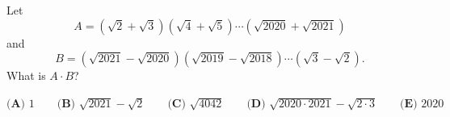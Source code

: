 Let
\[A=\left(\sqrt2+\sqrt3\right)\left(\sqrt4+\sqrt5\right)\cdots\left(\sqrt{2020}+\sqrt{2021}\right)\]
and
\[B=\left(\sqrt{2021}-\sqrt{2020}\right)\left(\sqrt{2019}-\sqrt{2018}\right)\cdots\left(\sqrt3-\sqrt2\right).\]
What is $A\cdot B$?

$\textbf{(A) }1\qquad\textbf{(B) }\sqrt{2021}-\sqrt2\qquad\textbf{(C) }\sqrt{4042}\qquad\textbf{(D) }\sqrt{2020\cdot2021}-\sqrt{2\cdot3}\qquad\textbf{(E) }2020$
